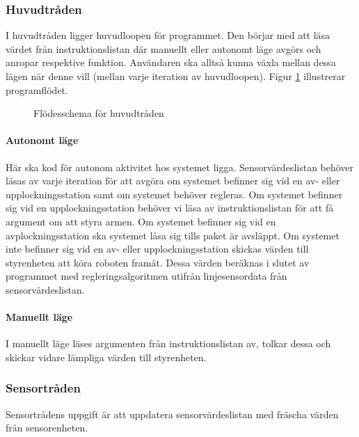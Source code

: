 \subsubsection{Huvudtråden}
I huvudtråden ligger huvudloopen för programmet. Den börjar med att läsa värdet från instruktionslistan där manuellt eller autonomt läge avgörs och anropar respektive funktion. Användaren ska alltså kunna växla mellan dessa lägen när denne vill (mellan varje iteration av huvudloopen). Figur \ref{designspec:huvudmodul-huvudtrad} illustrerar programflödet.

\begin{figure}[H]
\centering
\scalebox{0.6}{}
\caption{Flödesschema för huvudtråden} \label{designspec:huvudmodul-huvudtrad}
\end{figure}

\paragraph{Autonomt läge}
\leavevmode
\newline
\newline
Här ska kod för autonom aktivitet hos systemet ligga. Sensorvärdeslistan behöver läsas av varje iteration för att avgöra om systemet befinner sig vid en av- eller upplockningsstation samt om systemet behöver regleras. Om systemet befinner sig vid en upplockningsstation behöver vi läsa av instruktionslistan för att få argument om att styra armen. Om systemet befinner sig vid en avplockningsstation ska systemet låsa sig tills paket är avsläppt.
\newline 
Om systemet inte befinner sig vid en av- eller upplockningsstation skickas värden till styrenheten att köra roboten framåt. Dessa värden beräknas i slutet av programmet med regleringsalgoritmen utifrån linjesensordata från sensorvärdeslistan. 

\paragraph{Manuellt läge}
\leavevmode
\newline
\newline
I manuellt läge läses argumenten från instruktionslistan av, tolkar dessa och skickar vidare lämpliga värden till styrenheten.

\subsubsection{Sensortråden}
Sensortrådens uppgift är att uppdatera sensorvärdeslistan med fräscha värden från sensorenheten.

